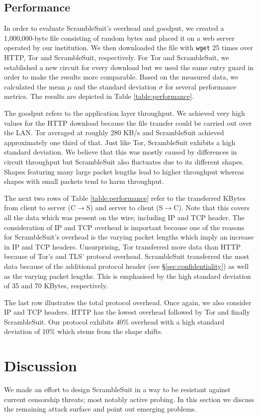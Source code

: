 \documentclass{sig-alternate}
\newcommand{\pt}{\textsf{ScrambleSuit}}
\numberwithin{enumi}{section}
\numberwithin{notesctr}{section}
\begin{document}
\subsection{Performance}
In order to evaluate \pt{}'s overhead and goodput, we created a 1,000,000-byte file consisting of
random bytes and placed it on a web server operated by our institution. We then downloaded the file
with \texttt{wget} 25 times over HTTP, Tor and \pt{}, respectively. For Tor and \pt{}, we
established a new circuit for every download but we used the same entry guard in order to make the
results more comparable. Based on the measured data, we calculated the mean $\mu$ and the standard
deviation $\sigma$ for several performance metrics. The results are depicted in Table
\ref{table:performance}.


The goodput refers to the application layer throughput. We achieved very high values for the HTTP
download because the file transfer could be carried out over the LAN. Tor averaged at roughly 280
KB/s and \pt{} achieved approximately one third of that. Just like Tor, \pt{} exhibits a high
standard deviation. We believe that this was mostly caused by differences in circuit throughput but
\pt{} also fluctuates due to its different shapes. Shapes featuring many large packet lengths lead
to higher throughput whereas shapes with small packets tend to harm throughput.

The next two rows of Table \ref{table:performance} refer to the transferred KBytes from client to
server (C$\to$S) and server to client (S$\to$C). Note that this covers all the data which was
present on the wire; including IP and TCP header. The consideration of IP and TCP overhead is
important because one of the reasons for \pt{}'s overhead is the varying packet lengths which
imply an increase in IP and TCP headers. Unsurprising, Tor transferred more data than HTTP because
of Tor's and TLS' protocol overhead. \pt{} transferred the most data because of the additional
protocol header (see \S \ref{sec:confidentiality}) as well as the varying packet lengths.
This is emphasised by the high standard deviation of 35 and 70 KBytes, respectively.

The last row illustrates the total protocol overhead. Once again, we also consider IP and TCP
headers. HTTP has the lowest overhead followed by Tor and finally \pt{}. Our protocol exhibits 40\%
overhead with a high standard deviation of 10\% which stems from the shape shifts.



\section{Discussion}
\label{sec:discussion}
We made an effort to design \pt{} in a way to be resistant against current censorship threats; most
notably active probing. In this section we discuss the remaining attack surface and point out
emerging problems.
\end{document}
